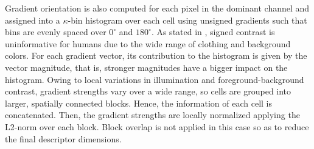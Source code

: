 \documentclass[10pt,twocolumn,letterpaper]{article}
\begin{document}





Gradient orientation is also computed for each pixel in the dominant channel and assigned into a $\kappa$-bin histogram over each cell using unsigned gradients such that bins are evenly spaced over $0^\circ$ and $180^\circ$. As stated in \cite{dalal2005histograms}, signed contrast is uninformative for humans due to the wide range of clothing and background colors. For each gradient vector, its contribution to the histogram is given by the vector magnitude, that is, stronger magnitudes have a bigger impact on the histogram. Owing to local variations in illumination and foreground-background contrast, gradient strengths vary over a wide range, so cells are grouped into larger, spatially connected blocks. Hence, the information of each cell is concatenated. Then, the gradient strengths are locally normalized applying the L2-norm over each block. Block overlap is not applied in this case so as to reduce the final descriptor dimensions. 
\end{document}
